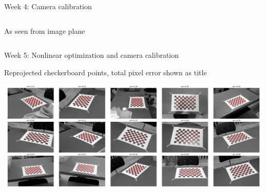 \documentclass[aspectratio=169,hyperref={pdfpagelabels=false}]{beamer}
\begin{document}
\begin{frame}{ Week 4: Camera calibration }
\begin{columns}
\begin{column}{.5\textwidth}
\begin{block}{As seen from image plane}
\begin{center}
		\end{center}
		\end{block}					
	\end{column}	
\end{columns}	
\end{frame}

\begin{frame}{ Week 5: Nonlinear optimization and camera calibration }
	\begin{block}{Reprojected checkerboard points, total pixel error shown as title}
		\begin{center}	
			\includegraphics[width=\textwidth]{exercise_imgs/ex5-8.png}
		\end{center}
	\end{block}
\end{frame}
\end{document}

